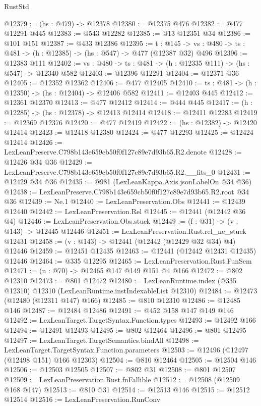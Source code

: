 \begin{lexlean}{RustStd}
\begin{coremodule}
@12379 := (hs : @479) -> @12378
@12380 := @12375 @476
@12382 := @477 @12291 @445
@12383 := @543 @12282
@12385 := @13 @12351 @34
@12386 := @101 @151
@12387 := @433 @12386
@12395 := {t : @145} ->
  {vs : @480} -> {ts : @481} -> (h : @12385) -> (hs : @547) -> @477 (@12387 @32) @496
@12396 := @12383 @111
@12402 := {vs : @480} -> {ts : @481} -> (h : @12335 @111) -> (hs : @547) -> @12340 @582
@12403 := @12396 @12291
@12404 := @12371 @36
@12405 := @12352 @12362
@12406 := @477 @12405
@12410 := {ts : @481} -> (h : @12350) -> (hs : @12404) -> @12406 @582
@12411 := @12403 @445
@12412 := @12361 @12370
@12413 := @477 @12412
@12414 := @444 @445
@12417 := (h : @12285) -> (hs : @12378) -> @12413 @12414
@12418 := @12411 @12283
@12419 := @12369 @12376
@12420 := @477 @12419
@12422 := (hs : @12382) -> @12420 @12414
@12423 := @12418 @12380
@12424 := @477 @12293
@12425 := @12424 @12414
@12426 := LexLeanPreserve.C798b143e659cb50f0f127c89e7d93b65.R2.denote
@12428 := @12426 @34 @36
@12429 := LexLeanPreserve.C798b143e659cb50f0f127c89e7d93b65.R2.__fits_0
@12431 := @12429 @34 @36
@12435 := @981 (LexLeanKappa.Axis.jsonLabelOn @34 @36)
@12438 := LexLeanPreserve.C798b143e659cb50f0f127c89e7d93b65.R2.root @34 @36
@12439 := Ne.{1}
@12440 := LexLeanPreservation.Obs
@12441 := @12439 @12440
@12442 := LexLeanPreservation.Rel
@12445 := @12441 (@12442 @36 @4)
@12446 := LexLeanPreservation.Obs.stuck
@12449 := (f : @31) -> (v : @143) -> @12445 @12446
@12451 := LexLeanPreservation.Rust.rel_ne_stuck @12431
@12458 := (v : @143) -> @12441 (@12442 (@12429 @32 @34) @4) @12446
@12459 := @12451 @12435
@12463 := @12441 (@12442 @12431 @12435) @12446
@12464 := @335 @12295
@12465 := LexLeanPreservation.Rust.FunSem
@12471 := (n : @70) -> @12465 @147 @149 @151 @4 @166
@12472 := @802 @12310
@12473 := @801 @12472
@12480 := LexLeanRuntime.index (@335 @12310) @12310 (LexLeanRuntime.instIndexableList @12310)
@12484 := @12473 (@12480 (@12311 @147) @166)
@12485 := @810 @12310
@12486 := @12485 @146
@12487 := @12484 @12486
@12491 := @452 @158 @147 @149 @146
@12492 := LexLeanTarget.TargetSyntax.Function.types
@12493 := @12492 @166
@12494 := @12491 @12493
@12495 := @802 @12464
@12496 := @801 @12495
@12497 := LexLeanTarget.TargetSemantics.bindAll
@12498 := LexLeanTarget.TargetSyntax.Function.parameters
@12503 := @12496 (@12497 (@12498 @151) @166 @12303)
@12504 := @810 @12464
@12505 := @12504 @146
@12506 := @12503 @12505
@12507 := @802 @31
@12508 := @801 @12507
@12509 := LexLeanPreservation.Rust.fnFallible
@12512 := @12508 (@12509 @168 @147)
@12513 := @810 @31
@12514 := @12513 @146
@12515 := @12512 @12514
@12516 := LexLeanPreservation.RunConv

\end{coremodule}
\end{lexlean}
